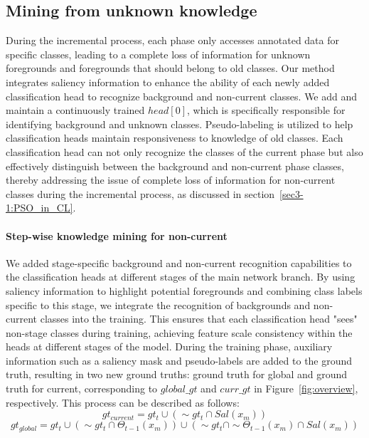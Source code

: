 \subsection{Mining from unknown knowledge}
\label{sec3-4:Local_Details}

During the incremental process, each phase only accesses annotated data for specific classes, leading to a complete loss of information for unknown foregrounds and foregrounds that should belong to old classes. Our method integrates saliency information to enhance the ability of each newly added classification head to recognize background and non-current classes. We add and maintain a continuously trained \(head[0]\), which is specifically responsible for identifying background and unknown classes. Pseudo-labeling is utilized to help classification heads maintain responsiveness to knowledge of old classes. Each classification head can not only recognize the classes of the current phase but also effectively distinguish between the background and non-current phase classes, thereby addressing the issue of complete loss of information for non-current classes during the incremental process, as discussed in section~\cref{sec3-1:PSO_in_CL}.

\paragraph{Step-wise knowledge mining for non-current}
We added stage-specific background and non-current recognition capabilities to the classification heads at different stages of the main network branch. By using saliency information to highlight potential foregrounds and combining class labels specific to this stage, we integrate the recognition of backgrounds and non-current classes into the training. This ensures that each classification head "sees" non-stage classes during training, achieving feature scale consistency within the heads at different stages of the model. During the training phase, auxiliary information such as a saliency mask and pseudo-labels are added to the ground truth, resulting in two new ground truths: ground truth for global and ground truth for current, corresponding to \(global\_gt\) and \(curr\_gt\) in Figure~\cref{fig:overview}, respectively. This process can be described as follows:
\[gt_{current}=gt_t\cup(\sim gt_t\cap Sal(x_m))\]
\[gt_{global}=gt_{t}\cup(\sim gt_{t}\cap\Theta_{t-1}(x_{m}))\cup(\sim gt_{t}\cap\sim\Theta_{t-1}(x_{m})\cap Sal(x_{m}))\]

